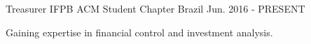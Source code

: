 \begin{cventries}
  \cventry
    {Treasurer} %
    {IFPB ACM Student Chapter} %
    {Brazil} %
    {Jun. 2016 - PRESENT} %
    {
      \begin{cvitems} %
        \item {Gaining expertise in financial control and investment analysis.}
      \end{cvitems}
    }

\end{cventries}
